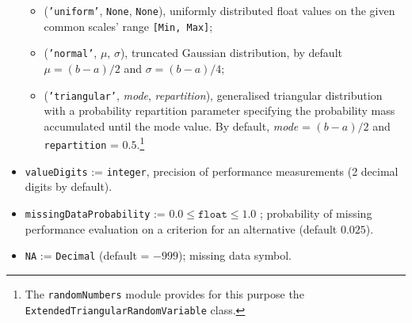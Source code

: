 \begin{itemize}[leftmargin=0.5cm,rightmargin=0.5cm]
\begin{itemize}[rightmargin=1cm]
         \item  (\texttt{'uniform'}, \texttt{None}, \texttt{None}), uniformly distributed float values on the given common scales' range \texttt{[Min, Max]};
         \item (\texttt{'normal'}, $\mu$, $\sigma$), truncated Gaussian distribution, by default $\mu = (b-a)/2$ and $\sigma = (b-a)/4$;
         \item (\texttt{'triangular'}, \emph{mode}, \emph{repartition}), generalised triangular distribution with a probability repartition parameter specifying the probability mass accumulated until the mode value. By default, \emph{mode} = $(b-a)/2$ and \texttt{repartition} = $0.5$.\footnote{The \texttt{randomNumbers} module provides for this purpose the \texttt{ExtendedTriangularRandomVariable} class.}
      \end{itemize}
\item \texttt{valueDigits} := \texttt{integer}, precision of performance measurements (2 decimal digits by default).
\item \texttt{missingDataProbability} := $0.0 \leq \mathtt{float} \leq 1.0$ ; probability of missing performance evaluation on a criterion for an alternative (default $0.025$).
\item \texttt{NA} := \texttt{Decimal} (default = $-999$); missing data symbol. \end{itemize} 

